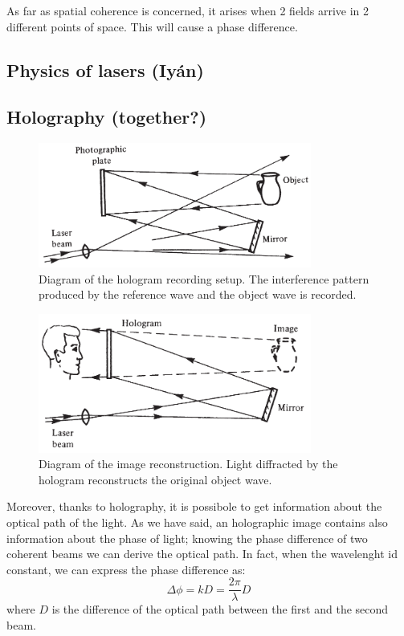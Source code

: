 \documentclass[11pt,a4paper]{article}
\begin{document}
As far as spatial coherence is concerned, it arises when 2 fields arrive in 2 different points of space. This will cause a phase difference.

\subsection{Physics of lasers (Iyán)}

\subsection{Holography (together?)}\label{sec:Holo}

\begin{figure}[ht]
\centering
\includegraphics[width=0.8\textwidth]{Hologram_recording}
\caption{Diagram of the hologram recording setup. The interference pattern produced by the reference wave and the object wave is recorded.\cite{hariharan_2002}}
\label{fig:hologram_recording}
\end{figure}

\begin{figure}[ht]
\centering
\includegraphics[width=0.8\textwidth]{Hologram_image_reconstruction}
\caption{Diagram of the image reconstruction. Light diffracted by the hologram reconstructs the original object wave.\cite{hariharan_2002}}
\label{fig:hologram_reconstruction}
\end{figure}

Moreover, thanks to holography, it is possibole to get information about the optical path of the light. As we have said, an holographic image contains also information about the phase of light; knowing the phase difference of two coherent beams we can derive the optical path. In fact, when the wavelenght id constant, we can express the phase difference as:
\begin{equation}
\Delta \phi=kD=\frac{2\pi}{\lambda}D\label{eq:Delphi}
\end{equation}
where $D$ is the difference of the optical path between the first and the second beam.
\end{document}
